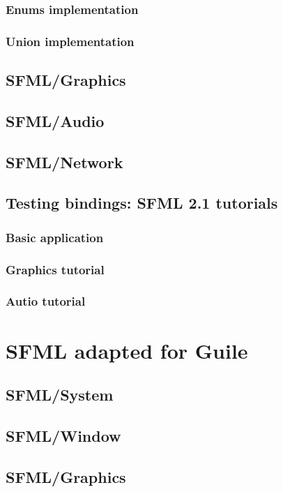 \documentclass[latterpaper, leqno]{article}
\begin{document}
\subsubsection*{Enums implementation}

\subsubsection*{Union implementation}

\subsection{SFML/Graphics}
\subsection{SFML/Audio}
\subsection{SFML/Network}
\subsection{Testing bindings: SFML 2.1 tutorials}
\subsubsection*{Basic application}
\subsubsection*{Graphics tutorial}
\subsubsection*{Autio tutorial}

\section{SFML adapted for Guile}
\subsection{SFML/System}
\subsection{SFML/Window}
\subsection{SFML/Graphics}
\end{document}
